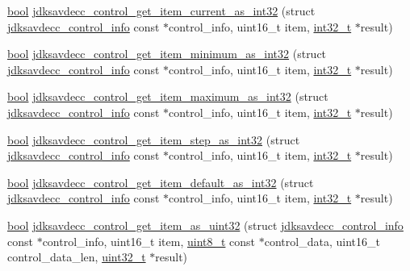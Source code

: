 \begin{DoxyCompactItemize}
\item 
\hyperlink{avb__gptp_8h_af6a258d8f3ee5206d682d799316314b1}{bool} \hyperlink{group__aem__control__value__helpers_ga52aa320067a79bd88ac4977e3e11abf2}{jdksavdecc\+\_\+control\+\_\+get\+\_\+item\+\_\+current\+\_\+as\+\_\+int32} (struct \hyperlink{structjdksavdecc__control__info}{jdksavdecc\+\_\+control\+\_\+info} const $\ast$control\+\_\+info, uint16\+\_\+t item, \hyperlink{parse_8c_a37994e3b11c72957c6f454c6ec96d43d}{int32\+\_\+t} $\ast$result)
\item 
\hyperlink{avb__gptp_8h_af6a258d8f3ee5206d682d799316314b1}{bool} \hyperlink{group__aem__control__value__helpers_ga2b937d5b1b0dd584a17e7ae59cc4b306}{jdksavdecc\+\_\+control\+\_\+get\+\_\+item\+\_\+minimum\+\_\+as\+\_\+int32} (struct \hyperlink{structjdksavdecc__control__info}{jdksavdecc\+\_\+control\+\_\+info} const $\ast$control\+\_\+info, uint16\+\_\+t item, \hyperlink{parse_8c_a37994e3b11c72957c6f454c6ec96d43d}{int32\+\_\+t} $\ast$result)
\item 
\hyperlink{avb__gptp_8h_af6a258d8f3ee5206d682d799316314b1}{bool} \hyperlink{group__aem__control__value__helpers_ga0bca896d76175f61d3e36181ace2bdac}{jdksavdecc\+\_\+control\+\_\+get\+\_\+item\+\_\+maximum\+\_\+as\+\_\+int32} (struct \hyperlink{structjdksavdecc__control__info}{jdksavdecc\+\_\+control\+\_\+info} const $\ast$control\+\_\+info, uint16\+\_\+t item, \hyperlink{parse_8c_a37994e3b11c72957c6f454c6ec96d43d}{int32\+\_\+t} $\ast$result)
\item 
\hyperlink{avb__gptp_8h_af6a258d8f3ee5206d682d799316314b1}{bool} \hyperlink{group__aem__control__value__helpers_ga47f0ee7be0914cdd59f1b54533170bbd}{jdksavdecc\+\_\+control\+\_\+get\+\_\+item\+\_\+step\+\_\+as\+\_\+int32} (struct \hyperlink{structjdksavdecc__control__info}{jdksavdecc\+\_\+control\+\_\+info} const $\ast$control\+\_\+info, uint16\+\_\+t item, \hyperlink{parse_8c_a37994e3b11c72957c6f454c6ec96d43d}{int32\+\_\+t} $\ast$result)
\item 
\hyperlink{avb__gptp_8h_af6a258d8f3ee5206d682d799316314b1}{bool} \hyperlink{group__aem__control__value__helpers_ga56aa0acfe8ef498e5f6a17859ddb3817}{jdksavdecc\+\_\+control\+\_\+get\+\_\+item\+\_\+default\+\_\+as\+\_\+int32} (struct \hyperlink{structjdksavdecc__control__info}{jdksavdecc\+\_\+control\+\_\+info} const $\ast$control\+\_\+info, uint16\+\_\+t item, \hyperlink{parse_8c_a37994e3b11c72957c6f454c6ec96d43d}{int32\+\_\+t} $\ast$result)
\item 
\hyperlink{avb__gptp_8h_af6a258d8f3ee5206d682d799316314b1}{bool} \hyperlink{group__aem__control__value__helpers_gaf4022373ecd8c46daa3c122a2488aa3c}{jdksavdecc\+\_\+control\+\_\+get\+\_\+item\+\_\+as\+\_\+uint32} (struct \hyperlink{structjdksavdecc__control__info}{jdksavdecc\+\_\+control\+\_\+info} const $\ast$control\+\_\+info, uint16\+\_\+t item, \hyperlink{stdint_8h_aba7bc1797add20fe3efdf37ced1182c5}{uint8\+\_\+t} const $\ast$control\+\_\+data, uint16\+\_\+t control\+\_\+data\+\_\+len, \hyperlink{parse_8c_a6eb1e68cc391dd753bc8ce896dbb8315}{uint32\+\_\+t} $\ast$result)

\end{DoxyCompactItemize}
